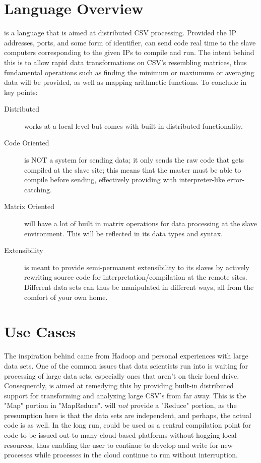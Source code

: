 \documentclass[10pt]{article}
\title{\name}
\author{Mikhail Klimentov, Michael Nguyen, Prateek Sinha, Yuchen Zeng, Eli Bogom-Shanon}
\begin{document}
\maketitle

\section{Language Overview}
    \name is a language that is aimed at distributed CSV processing. Provided the IP addresses, ports, and some form of identifier, \name can send code real time to the slave computers corresponding to the given IPs to compile and run. The intent behind this is to allow rapid data transformations on CSV's resembling matrices, thus fundamental operations such as finding the minimum or maxiumum or averaging data will be provided, as well as mapping arithmetic functions. To conclude in key points:
    \begin{description}
    \item[Distributed] \name works at a local level but comes with built in distributed functionality.
    \item[Code Oriented] \name is NOT a system for sending data; it only sends the raw code that gets compiled at the slave site; this means that the master must be able to compile before sending, effectively providing \name with interpreter-like error-catching.
    \item[Matrix Oriented] \name will have a lot of built in matrix operations for data processing at the slave environment. This will be reflected in its data types and syntax.
    \item[Extensibility] \name is meant to provide semi-permanent extensibility to its slaves by actively rewriting source code for interpretation/compilation at the remote sites. 
        Different data sets can thus be manipulated in different ways, all from the comfort of your own home.
    \end{description}
    
\section{Use Cases}
	The inspiration behind \name came from Hadoop and personal experiences with large data sets. One of the common issues that data scientists run into is waiting for processing of large data sets, especially ones that aren't on their local drive. Consequently, \name is aimed at remedying this by providing built-in distributed support for transforming and analyzing large CSV's from far away. This is the "Map" portion in "MapReduce". \name will \emph{not} provide a "Reduce" portion, as the presumption here is that the data sets are independent, and perhaps, the actual code is as well.
    In the long run, \name could be used as a central compilation point for code to be issued out to many cloud-based platforms without hogging local resources, thus enabling the user to continue to develop and write for new processes while processes in the cloud continue to run without interruption.
    
\end{document}
